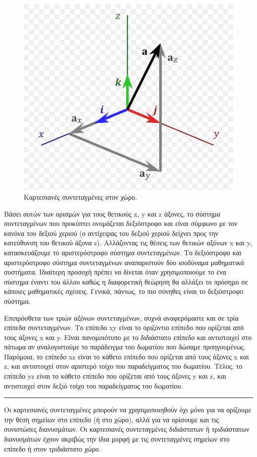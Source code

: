 \begin{figure}[h]
    \centering
    \includegraphics[scale=0.3]{Figures/appendixA_cartesian3D.jpg}
    \caption{Καρτεσιανές συντεταγμένες στον χώρο.}
    \label{fig:apxA_cartesian3D}
\end{figure}

Βάσει αυτών των ορισμών για τους θετικούς x, y και z άξονες, το σύστημα συντεταγμένων που προκύπτει ονομάζεται δεξιόστροφο και είναι σύμφωνο με τον κανόνα του δεξιού χεριού (ο αντίχειρας του δεξιού χεριού δείχνει προς την κατεύθυνση του θετικού άξονα z). Αλλάζοντας τις θέσεις των θετικών αξόνων x και y, κατασκευάζουμε το αριστερόστροφο σύστημα συντεταγμένων. Το δεξιόστροφο και αριστερόστροφο σύστημα συντεταγμένων αναπαριστούν δύο ισοδύναμα μαθηματικά συστήματα. Ιδιαίτερη προσοχή πρέπει να δίνεται όταν χρησιμοποιούμε το ένα σύστημα έναντι του άλλου καθώς η διαφορετική θεώρηση θα αλλάξει το πρόσημο σε κάποιες μαθηματικές σχέσεις. Γενικά, πάντως, το πιο σύνηθες είναι το δεξιόστροφο σύστημα.

Επιπρόσθετα των τριών αξόνων συντεταγμένων, συχνά αναφερόμαστε και σε τρία επίπεδα συντεταγμένων. Το επίπεδο xy είναι το οριζόντιο επίπεδο που ορίζεται από τους άξονες x και y. Είναι πανομοιότυπο με το διδιάστατο επίπεδο και αντιστοιχεί στο πάτωμα αν αναλογιστούμε το παράδειγμα του δωματίου που δώσαμε προηγουμένως. Παρόμοια, το επίπεδο xz είναι το κάθετο επίπεδο που ορίζεται από τους άξονες x και z, και αντιστοιχεί στον αριστερό τοίχο του παραδείγματος του δωματίου. Τέλος, το επίπεδο yz είναι το κάθετο επίπεδο που ορίζεται από τους άξονες y και z, και αντιστοιχεί στον δεξιό τοίχο του παραδείγματος του δωματίου. 
\\
{\color{red} \hrule}
Οι καρτεσιανές συντεταγμένες μπορούν να χρησιμοποιηθούν όχι μόνο για να ορίζουμε την θέση σημείων στο επίπεδο (ή στο χώρο), αλλά για να ορίσουμε και τις συνιστώσες διανυσμάτων. Οι καρτεσιανές συντεταγμένες διδιάστατων ή τριδιάστατων διανυσμάτων έχουν ακριβώς την ίδια μορφή με τις συντεταγμένες σημείων στο επίπεδο ή στον τριδιάστατο χώρο.

